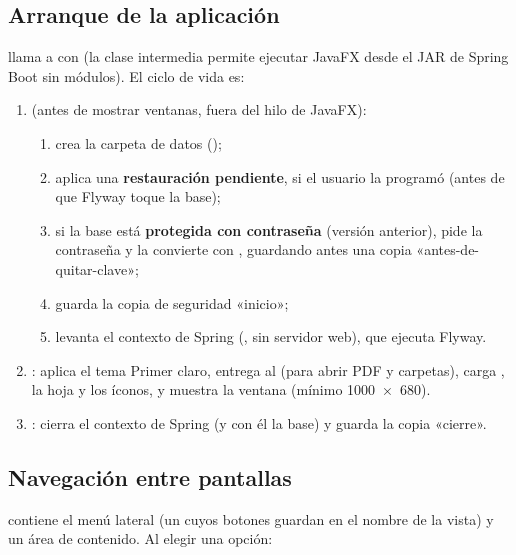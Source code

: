 \subsection{Arranque de la aplicación}
\label{sec:t-arranque}

 llama a  con  (la clase intermedia permite
ejecutar JavaFX desde el JAR de Spring Boot sin módulos). El ciclo de vida es:

\begin{enumerate}
	\item \textbf{} (antes de mostrar ventanas, fuera del hilo de JavaFX):
	\begin{enumerate}
		\item crea la carpeta de datos ();
		\item aplica una \textbf{restauración pendiente}, si el usuario la programó (antes de que Flyway toque la base);
		\item si la base está \textbf{protegida con contraseña} (versión anterior), pide la contraseña y la convierte con
		      , guardando antes una copia «antes-de-quitar-clave»;
		\item guarda la copia de seguridad «inicio»;
		\item levanta el contexto de Spring (, sin servidor web), que ejecuta Flyway.
	\end{enumerate}
	\item \textbf{}: aplica el tema Primer claro, entrega  al 
	      (para abrir PDF y carpetas), carga , la hoja  y los íconos, y muestra la
	      ventana (mínimo 1000~×~680).
	\item \textbf{}: cierra el contexto de Spring (y con él la base) y guarda la copia «cierre».
\end{enumerate}

\subsection{Navegación entre pantallas}

 contiene el menú lateral (un  cuyos botones guardan en  el nombre
de la vista) y un área de contenido. Al elegir una opción:

